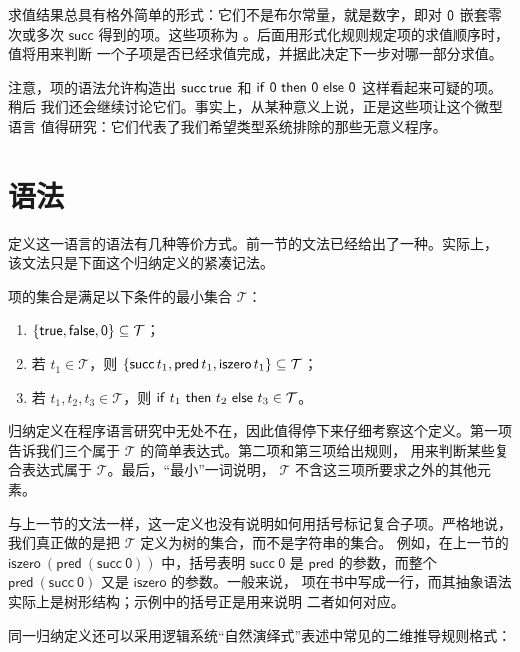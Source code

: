 求值结果总具有格外简单的形式：它们不是布尔常量，就是数字，即对
\(\mathsf{0}\) 嵌套零次或多次 \(\mathsf{succ}\) 得到的项。这些项称为
。后面用形式化规则规定项的求值顺序时，值将用来判断
一个子项是否已经求值完成，并据此决定下一步对哪一部分求值。

注意，项的语法允许构造出 \(\mathsf{succ}\,\mathsf{true}\) 和
\(\mathsf{if}\ \mathsf{0}\ \mathsf{then}\ \mathsf{0}\ \mathsf{else}\ \mathsf{0}\) 这样看起来可疑的项。稍后
我们还会继续讨论它们。事实上，从某种意义上说，正是这些项让这个微型语言
值得研究：它们代表了我们希望类型系统排除的那些无意义程序。

\section{语法}
\label{sec:3.2}

定义这一语言的语法有几种等价方式。前一节的文法已经给出了一种。实际上，
该文法只是下面这个归纳定义的紧凑记法。

\begin{definition}[项：归纳定义]
\label{def:3.2.1}
项的集合是满足以下条件的最小集合 \(\mathcal{T}\)：
\begin{enumerate}
  \item \(\{\mathsf{true},\mathsf{false},\mathsf{0}\}\subseteq\mathcal{T}\)；
  \item 若 \(t_1\in\mathcal{T}\)，则
    \(\{\mathsf{succ}\,t_1,\mathsf{pred}\,t_1,\mathsf{iszero}\,t_1\}
      \subseteq\mathcal{T}\)；
  \item 若 \(t_1,t_2,t_3\in\mathcal{T}\)，则
    \(\mathsf{if}\ t_1\ \mathsf{then}\ t_2\ \mathsf{else}\ t_3\in\mathcal{T}\)。
\end{enumerate}
\end{definition}

归纳定义在程序语言研究中无处不在，因此值得停下来仔细考察这个定义。第一项
告诉我们三个属于 \(\mathcal{T}\) 的简单表达式。第二项和第三项给出规则，
用来判断某些复合表达式属于 \(\mathcal{T}\)。最后，“最小”一词说明，
\(\mathcal{T}\) 不含这三项所要求之外的其他元素。

与上一节的文法一样，这一定义也没有说明如何用括号标记复合子项。严格地说，
我们真正做的是把 \(\mathcal{T}\) 定义为树的集合，而不是字符串的集合。
例如，在上一节的 \(\mathsf{iszero\ (pred\ (succ\ 0))}\) 中，括号表明
\(\mathsf{succ\ 0}\) 是 \(\mathsf{pred}\) 的参数，而整个
\(\mathsf{pred\ (succ\ 0)}\) 又是 \(\mathsf{iszero}\) 的参数。一般来说，
项在书中写成一行，而其抽象语法实际上是树形结构；示例中的括号正是用来说明
二者如何对应。

同一归纳定义还可以采用逻辑系统“自然演绎式”表述中常见的二维推导规则格式：

